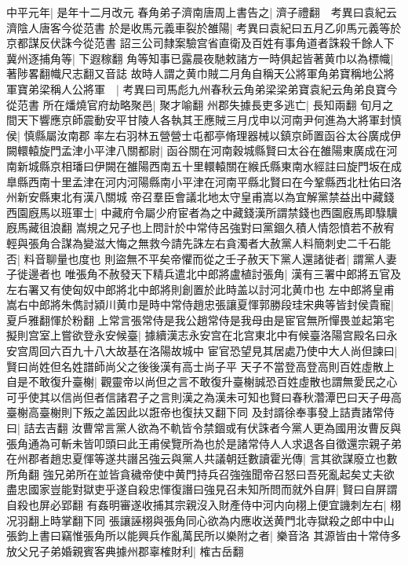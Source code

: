 中平元年|{
	是年十二月改元}
春角弟子濟南唐周上書告之|{
	濟子禮翻　考異曰袁紀云濟陰人唐客今從范書}
於是收馬元義車裂於雒陽|{
	考異曰袁紀曰五月乙卯馬元義等於京都謀反伏誅今從范書}
詔三公司隸案驗宫省直衛及百姓有事角道者誅殺千餘人下冀州逐捕角等|{
	下遐稼翻}
角等知事已露晨夜馳敕諸方一時俱起皆著黄巾以為標幟|{
	著陟畧翻幟尺志翻又音誌}
故時人謂之黄巾賊二月角自稱天公將軍角弟寶稱地公將軍寶弟梁稱人公將軍　|{
	考異曰司馬彪九州春秋云角弟梁梁弟寶袁紀云角弟良寶今從范書}
所在燔燒官府劫略聚邑|{
	聚才喻翻}
州郡失據長吏多逃亡|{
	長知兩翻}
旬月之間天下響應京師震動安平甘陵人各執其王應賊三月戊申以河南尹何進為大將軍封慎侯|{
	慎縣屬汝南郡}
率左右羽林五營營士屯都亭脩理器械以鎮京師置函谷太谷廣成伊闕轘轅旋門孟津小平津八關都尉|{
	函谷關在河南穀城縣賢曰太谷在雒陽東廣成在河南新城縣京相璠曰伊闕在雒陽西南五十里轘轅關在緱氏縣東南水經註曰旋門坂在成臯縣西南十里孟津在河内河陽縣南小平津在河南平縣北賢曰在今鞏縣西北杜佑曰洛州新安縣東北有漢八關城}
帝召羣臣會議北地太守皇甫嵩以為宜解黨禁益出中藏錢西園廐馬以班軍士|{
	中藏府令屬少府宦者為之中藏錢漢所謂禁錢也西園廐馬即騄驥廐馬藏徂浪翻}
嵩規之兄子也上問計於中常侍呂強對曰黨錮久積人情怨憤若不赦宥輕與張角合謀為變滋大悔之無救今請先誅左右貪濁者大赦黨人料簡刺史二千石能否|{
	料音聊量也度也}
則盜無不平矣帝懼而從之壬子赦天下黨人還諸徙者|{
	謂黨人妻子徙邊者也}
唯張角不赦發天下精兵遣北中郎將盧植討張角|{
	漢有三署中郎將五官及左右署又有使匈奴中郎將北中郎將則創置於此時盖以討河北黄巾也}
左中郎將皇甫嵩右中郎將朱儁討潁川黄巾是時中常侍趙忠張讓夏惲郭勝段珪宋典等皆封侯貴寵|{
	夏戶雅翻惲於粉翻}
上常言張常侍是我公趙常侍是我母由是宦官無所憚畏並起第宅擬則宫室上嘗欲登永安候臺|{
	據續漢志永安宫在北宫東北中有候臺洛陽宫殿名曰永安宫周回六百九十八大故基在洛陽故城中}
宦官恐望見其居處乃使中大人尚但諫曰|{
	賢曰尚姓但名姓譜師尚父之後後漢有高士尚子平}
天子不當登高登高則百姓虛散上自是不敢復升臺榭|{
	觀靈帝以尚但之言不敢復升臺榭誠恐百姓虛散也謂無愛民之心可乎使其以信尚但者信諸君子之言則漢之為漢未可知也賢曰春秋濳潭巴曰天子毋高臺榭高臺榭則下叛之盖因此以誑帝也復扶又翻下同}
及封諝徐奉事發上詰責諸常侍曰|{
	詰去吉翻}
汝曹常言黨人欲為不軌皆令禁錮或有伏誅者今黨人更為國用汝曹反與張角通為可斬未皆叩頭曰此王甫侯覽所為也於是諸常侍人人求退各自徵還宗親子弟在州郡者趙忠夏惲等遂共譖呂強云與黨人共議朝廷數讀霍光傳|{
	言其欲謀廢立也數所角翻}
強兄弟所在並皆貪穢帝使中黄門持兵召強強聞帝召怒曰吾死亂起矣丈夫欲盡忠國家豈能對獄吏乎遂自殺忠惲復譖曰強見召未知所問而就外自屛|{
	賢曰自屏謂自殺也屏必郢翻}
有姦明審遂收捕其宗親沒入財產侍中河内向栩上便宜譏刺左右|{
	栩况羽翻上時掌翻下同}
張讓誣栩與張角同心欲為内應收送黄門北寺獄殺之郎中中山張鈞上書曰竊惟張角所以能興兵作亂萬民所以樂附之者|{
	樂音洛}
其源皆由十常侍多放父兄子弟婚親賓客典據州郡辜榷財利|{
	榷古岳翻}

